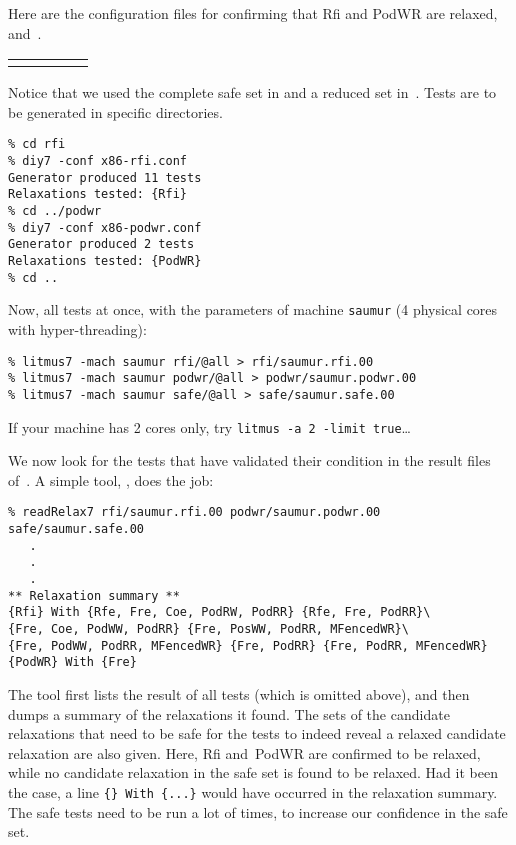 Here are the configuration files for confirming
that Rfi and PodWR are relaxed, 
and~.
\begin{center}\small
\begin{tabular}{p{0.7\linewidth}@{\quad}|@{\quad}p{0.2\linewidth}}
 &

\end{tabular}
\end{center}
Notice that we used the complete safe set in
 and a reduced set in~.
Tests are to be generated in specific directories.
\begin{verbatim}
% cd rfi
% diy7 -conf x86-rfi.conf
Generator produced 11 tests
Relaxations tested: {Rfi}
% cd ../podwr
% diy7 -conf x86-podwr.conf
Generator produced 2 tests
Relaxations tested: {PodWR}
% cd ..
\end{verbatim}

Now,  all tests at once, with the
parameters of machine \texttt{saumur} (4 physical cores with hyper-threading):
\begin{verbatim}
% litmus7 -mach saumur rfi/@all > rfi/saumur.rfi.00
% litmus7 -mach saumur podwr/@all > podwr/saumur.podwr.00
% litmus7 -mach saumur safe/@all > safe/saumur.safe.00
\end{verbatim}
If your machine has 2 cores only, try \verb+litmus -a 2 -limit true+\ldots

\label{readRelax:intro}We now look for
the tests that have validated their condition
in the result files of~\litmus.
A simple tool, \readRelax, does the job:
\begin{verbatim}
% readRelax7 rfi/saumur.rfi.00 podwr/saumur.podwr.00 safe/saumur.safe.00
   .
   .
   .
** Relaxation summary **
{Rfi} With {Rfe, Fre, Coe, PodRW, PodRR} {Rfe, Fre, PodRR}\
{Fre, Coe, PodWW, PodRR} {Fre, PosWW, PodRR, MFencedWR}\
{Fre, PodWW, PodRR, MFencedWR} {Fre, PodRR} {Fre, PodRR, MFencedWR}
{PodWR} With {Fre}
\end{verbatim}
The tool \readRelax{} first lists the result of all tests
(which is omitted above), and then dumps a summary of the
relaxations it found.
The sets of the candidate relaxations  that need to be safe for the tests to
indeed reveal  a relaxed candidate relaxation are also given.
Here, Rfi and~PodWR are confirmed to be relaxed, while no candidate relaxation
in the safe set is found to be relaxed.
Had it been the case, a line \verb+{} With {...}+ would have occurred
in the relaxation summary.
The safe tests need to be run a lot of times, to increase our
confidence in the safe set.

